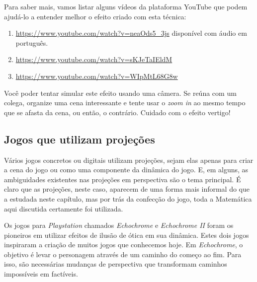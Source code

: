 Para saber mais, vamos listar alguns vídeos da plataforma YouTube que podem ajudá-lo a entender melhor o efeito criado com esta técnica:
\begin{enumerate}
\item {} 
\url{https://www.youtube.com/watch?v=neaOds5\_3js} disponível com áudio em português.

\item {} 
\url{https://www.youtube.com/watch?v=sKJeTaIEldM}

\item {} 
\url{https://www.youtube.com/watch?v=WIpMtL68G8w}

\end{enumerate}

Você poder tentar simular este efeito usando uma câmera. Se reúna com um colega, organize uma cena interessante e tente usar o \emph{zoom in} ao mesmo tempo que se afasta da cena, ou então, o contrário. Cuidado com o efeito vertigo!


\subsection{Jogos que utilizam projeções}
\label{\detokenize{GE301-A:jogos-que-utilizam-projecoes}}\label{\detokenize{GE301-A:sub-jogos}}
Vários jogos concretos ou digitais utilizam projeções, sejam elas apenas para criar a cena do jogo ou como uma componente da dinâmica do jogo. E, em alguns, as ambiguidades existentes nas projeções em perspectiva são o tema principal.  É claro que as projeções, neste caso, aparecem de uma forma mais informal do que a estudada neste capítulo, mas por trás da confecção do jogo, toda a Matemática aqui discutida certamente foi utilizada.

Os jogos para \emph{Playstation} chamados \emph{Echochrome} e \emph{Echochrome II} foram os pioneiros em utilizar efeitos de ilusão de ótica em sua dinâmica. Estes dois jogos inspiraram a criação de muitos jogos que conhecemos hoje. Em \emph{Echochrome}, o objetivo é levar o personagem através de um caminho do começo ao fim. Para isso, são necessárias mudanças de perspectiva que transformam caminhos impossíveis em factíveis.



